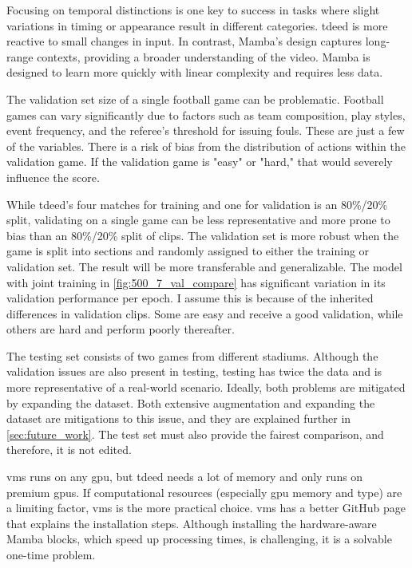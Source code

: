 Focusing on temporal distinctions is one key to success in tasks where slight variations in timing or appearance result in different categories. \acrshort{tdeed} is more reactive to small changes in input. In contrast, Mamba's design captures long-range contexts, providing a broader understanding of the video. Mamba is designed to learn more quickly with linear complexity and requires less data.

The validation set size of a single football game can be problematic. Football games can vary significantly due to factors such as team composition, play styles, event frequency, and the referee's threshold for issuing fouls. These are just a few of the variables. There is a risk of bias from the distribution of actions within the validation game. If the validation game is "easy" or "hard," that would severely influence the score. 

While \acrshort{tdeed}'s four matches for training and one for validation is an 80\%/20\% split, validating on a single game can be less representative and more prone to bias than an 80\%/20\% split of clips. The validation set is more robust when the game is split into sections and randomly assigned to either the training or validation set. The result will be more transferable and generalizable. The model with joint training in \cref{fig:500_7_val_compare} has significant variation in its validation performance per epoch. I assume this is because of the inherited differences in validation clips. Some are easy and receive a good validation, while others are hard and perform poorly thereafter. 

The testing set consists of two games from different stadiums. Although the validation issues are also present in testing, testing has twice the data and is more representative of a real-world scenario. Ideally, both problems are mitigated by expanding the dataset. Both extensive augmentation and expanding the dataset are mitigations to this issue, and they are explained further in \cref{sec:future_work}. The test set must also provide the fairest comparison, and therefore, it is not edited. 

\acrshort{vms} runs on any \acrshort{gpu}, but \acrshort{tdeed} needs a lot of memory and only runs on premium \acrshort{gpu}s. If computational resources (especially \acrshort{gpu} memory and type) are a limiting factor, \acrshort{vms} is the more practical choice. \acrshort{vms} has a better GitHub page that explains the installation steps. Although installing the hardware-aware Mamba blocks, which speed up processing times, is challenging, it is a solvable one-time problem.


